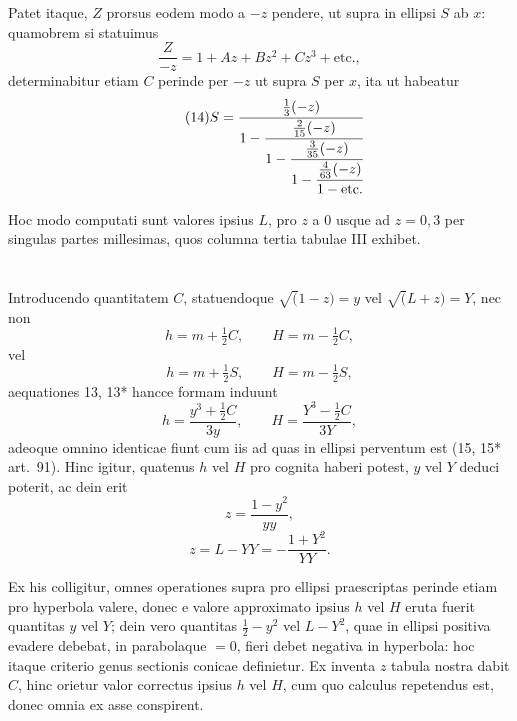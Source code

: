 \documentclass[12pt,a4paper]{article}
\begin{document}
Patet itaque, $Z$ prorsus eodem modo a $-z$ pendere, ut supra in ellipsi $S$
ab $x$: quamobrem si statuimus
\[
\frac{Z}{-z} = 1 + Az + Bz^2 + Cz^3 + \text{etc.},
\]
determinabitur etiam $C$ perinde per $-z$ ut supra $S$ per $x$, ita ut habeatur
\begin{equation}\tag{14}
S = \cfrac{\tfrac{1}{3}(-z)}{1 - \cfrac{\tfrac{2}{15}(-z)}{1 - \cfrac{\tfrac{3}{35}(-z)}{1 - \cfrac{\tfrac{4}{63}(-z)}{1 - \text{etc.}}}}}
\end{equation}

Hoc modo computati sunt valores ipsius $L$, pro $z$ a $0$ usque ad $z = 0{,}3$ per
singulas partes millesimas, quos columna tertia tabulae III exhibet.

\section{}

Introducendo quantitatem $C$, statuendoque $\surd(1 - z) = y$ vel $\surd(L + z) = Y$,
nec non
\[
h = m + \tfrac{1}{2}C, \qquad H = m - \tfrac{1}{2}C,
\]
vel
\[
h = m + \tfrac{1}{2}S, \qquad H = m - \tfrac{1}{2}S,
\]
aequationes 13, 13* hancce formam induunt
\[
h = \frac{y^3 + \tfrac{1}{2}C}{3y}, \qquad H = \frac{Y^3 - \tfrac{1}{2}C}{3Y},
\]
adeoque omnino identicae fiunt cum iis ad quas in ellipsi perventum est (15,
15* art.~91). Hinc igitur, quatenus $h$ vel $H$ pro cognita haberi potest, $y$ vel
$Y$ deduci poterit, ac dein erit
\begin{equation}\tag{17}
z = \frac{1 - y^2}{yy},
\end{equation}
\begin{equation}\tag{17*}
z = L - YY = -\frac{1 + Y^2}{YY}.
\end{equation}

Ex his colligitur, omnes operationes supra pro ellipsi praescriptas perinde
etiam pro hyperbola valere, donec e valore approximato ipsius $h$ vel $H$ eruta
fuerit quantitas $y$ vel $Y$; dein vero quantitas $\frac{1}{2} - y^2$ vel $L - Y^2$, quae in
ellipsi positiva evadere debebat, in parabolaque $= 0$, fieri debet negativa in
hyperbola: hoc itaque criterio genus sectionis conicae definietur. Ex inventa
$z$ tabula nostra dabit $C$, hinc orietur valor correctus ipsius $h$ vel $H$, cum quo
calculus repetendus est, donec omnia ex asse conspirent.
\end{document}
